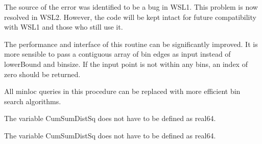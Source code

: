 \begin{DoxyRefList}
 The source of the error was identified to be a bug in WSL1. This problem is now resolved in WSL2. However, the code will be kept intact for future compatibility with WSL1 and those who still use it. 
\item[Subprogram \mbox{\hyperlink{namespaceHistogram__mod_ad80a9c34cbdd54d1c6b5d652c4def668}{Histogram\+\_\+mod\+::get\+Bin}} (x, lower\+Bound, nbin, binsize)]\label{todo__todo000031}%
%
 The performance and interface of this routine can be significantly improved. It is more sensible to pass a contiguous array of bin edges as input instead of {\ttfamily lower\+Bound} and {\ttfamily binsize}. If the input point is not within any bins, an index of zero should be returned. 
\item[Subprogram \mbox{\hyperlink{namespaceKmeans__mod_ac4b9beeaf1a19b79cfd5aacb8915fb02}{Kmeans\+\_\+mod\+::run\+KPP}} (nc, nd, np, Point, Sum\+Point, Membership, Size, potential)]\label{todo__todo000032}%
%
 All {\ttfamily minloc} queries in this procedure can be replaced with more efficient bin search algorithms.

\label{todo__todo000033}%
%
 The variable {\ttfamily Cum\+Sum\+Dist\+Sq} does not have to be defined as {\ttfamily real64}. 
\item[Subprogram \mbox{\hyperlink{namespaceKmeansOOP__mod_af12decb1817c7b3691239edf3ef79eff}{Kmeans\+OOP\+\_\+mod\+::run\+KPP}} (nc, nd, np, Point, Sum\+Point, Membership, Size, potential)]\label{todo__todo000035}%
%
 The variable {\ttfamily Cum\+Sum\+Dist\+Sq} does not have to be defined as {\ttfamily real64}.


\end{DoxyRefList}
